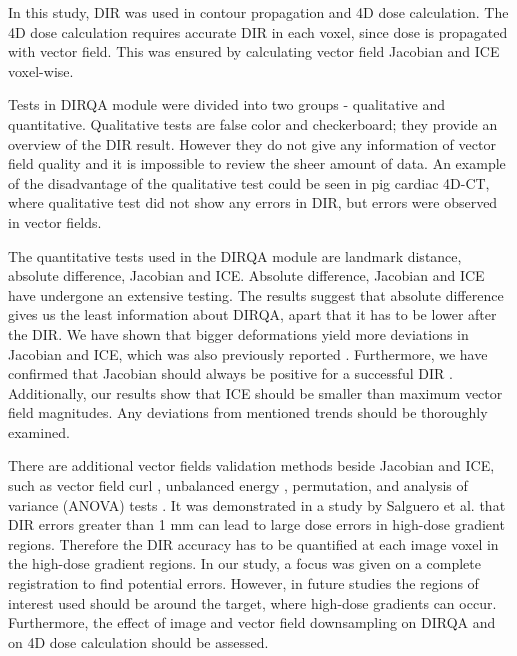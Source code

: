 In this study, DIR was used in contour propagation and 4D dose calculation. The 4D dose calculation requires 
accurate DIR in each voxel, since dose is propagated with vector field. This was ensured by calculating vector field Jacobian and ICE voxel-wise. 

Tests in DIRQA module were divided into two groups - qualitative and quantitative. Qualitative tests are false color and checkerboard; they provide an overview of the DIR result.
However they do not give any information of vector field quality and it is impossible to review the sheer amount of data. An example of the disadvantage of the qualitative test could be seen in pig cardiac 4D-CT, where qualitative test did not show
any errors in DIR, but errors were observed in vector fields. 

The quantitative tests used in the DIRQA module are landmark distance, absolute difference, Jacobian and ICE. Absolute difference, Jacobian and ICE have undergone an extensive testing. The results suggest
that absolute difference gives us the least information about DIRQA, apart that it has to be lower after the DIR. 
We have shown that bigger deformations yield more deviations in Jacobian and ICE, which was also previously reported \cite{Stanley2013}. 
Furthermore, we have confirmed that Jacobian should always be positive for a successful DIR \cite{Rey2002}. Additionally, our results show that ICE should 
be smaller than maximum vector field magnitudes. Any deviations from mentioned trends should be thoroughly examined.

There are additional vector fields validation methods beside Jacobian and ICE, such as vector field curl \cite{Schreibmann2012}, unbalanced energy \cite{Zhong2007}, 
permutation, and analysis of variance (ANOVA) tests \cite{Klein2009}.
It was demonstrated in a study by Salguero et al. \cite{Salguero2011} that DIR errors greater than 1 mm can lead to large dose errors in high-dose gradient regions. 
Therefore the DIR accuracy has to be quantified at each image voxel in the high-dose 
gradient regions. In our study, a focus was given on a complete registration to find potential errors. However, in future studies the regions of interest used
should be around the target, where high-dose gradients can occur. Furthermore, the effect of image and vector field downsampling on DIRQA and on 4D dose calculation should be assessed.

